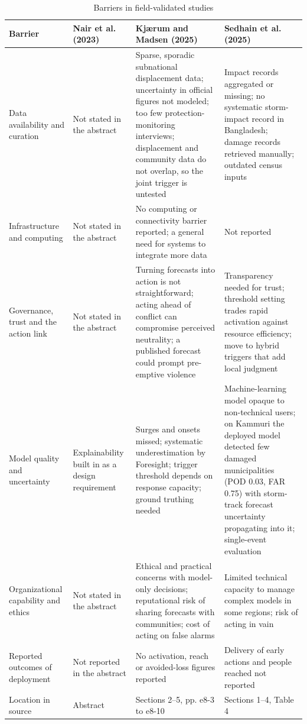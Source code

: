\begin{table}[htbp!]
\centering
\scriptsize
\caption{Barriers in field-validated studies}
\label{tab:deployment_barriers}
\begin{tabular}{@{}L{2.3cm}L{3.95cm}L{3.95cm}L{3.95cm}@{}}
\toprule
\textbf{Barrier} & \textbf{Nair et al. (2023)} \cite{Nair2023ExplainableHumanitarianNeeds} & \textbf{Kj\ae{}rum and Madsen (2025)} \cite{Kjaerum2025DisplacementAnticipatory} & \textbf{Sedhain et al. (2025)} \cite{Sedhain2025ImpactBasedCycloneForecasting} \\
\midrule
Data availability and curation & Not stated in the abstract & Sparse, sporadic subnational displacement data; uncertainty in official figures not modeled; too few protection-monitoring interviews; displacement and community data do not overlap, so the joint trigger is untested & Impact records aggregated or missing; no systematic storm-impact record in Bangladesh; damage records retrieved manually; outdated census inputs \\[3pt]
Infrastructure and computing & Not stated in the abstract & No computing or connectivity barrier reported; a general need for systems to integrate more data & Not reported \\[3pt]
Governance, trust and the action link & Not stated in the abstract & Turning forecasts into action is not straightforward; acting ahead of conflict can compromise perceived neutrality; a published forecast could prompt pre-emptive violence & Transparency needed for trust; threshold setting trades rapid activation against resource efficiency; move to hybrid triggers that add local judgment \\[3pt]
Model quality and uncertainty & Explainability built in as a design requirement & Surges and onsets missed; systematic underestimation by Foresight; trigger threshold depends on response capacity; ground truthing needed & Machine-learning model opaque to non-technical users; on Kammuri the deployed model detected few damaged municipalities (POD 0.03, FAR 0.75) with storm-track forecast uncertainty propagating into it; single-event evaluation \\[3pt]
Organizational capability and ethics & Not stated in the abstract & Ethical and practical concerns with model-only decisions; reputational risk of sharing forecasts with communities; cost of acting on false alarms & Limited technical capacity to manage complex models in some regions; risk of acting in vain \\[3pt]
Reported outcomes of deployment & Not reported in the abstract & No activation, reach or avoided-loss figures reported & Delivery of early actions and people reached not reported \\[3pt]
\midrule
Location in source & Abstract & Sections 2--5, pp. e8-3 to e8-10 & Sections 1--4, Table 4 \\
\bottomrule
\end{tabular}
\end{table}

